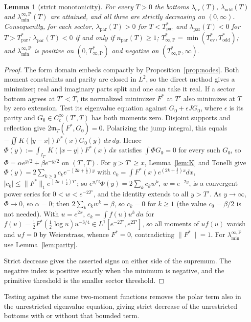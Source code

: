 \documentclass[10pt]{amsart}
\newtheorem{lemma}[theorem]{Lemma}
\theoremstyle{definition}
\theoremstyle{remark}
\newcommand{\mT}{\mathfrak m_T}
\newcommand{\laminfP}{\lambda^{\infty,\mathrm P}_{\min}}
\begin{document}
\begin{lemma}[strict monotonicity]\label{lem:strict}
For every $T>0$ the bottoms $\lambda_{\mathrm{ev}}(T)$, $\lambda_{\mathrm{odd}}(T)$ and
$\laminfP(T)$ are attained, and all three are strictly decreasing on $(0,\infty)$. Consequently, for each
sector, $\lambda_{\mathrm{par}}(T)>0$ for $T<T^*_{\mathrm{par}}$ and $\lambda_{\mathrm{par}}(T)<0$ for
$T>T^*_{\mathrm{par}}$; $\lambda_{\mathrm{par}}(T)<0$ if and only if $n_{\mathrm{par}}(T)\ge1$;
$T^*_{\infty,\mathrm P}=\min(T^*_{\mathrm{ev}},T^*_{\mathrm{odd}})$; and $\laminfP$ is positive on
$(0,T^*_{\infty,\mathrm P})$ and negative on $(T^*_{\infty,\mathrm P},\infty)$.
\end{lemma}
\begin{proof}
The form domain embeds compactly by Proposition~\ref{prop:nodes}. Both
moment constraints and parity are closed in $L^2$, so the direct method
gives a minimizer; real and imaginary parts split and one can take it real.
If a sector bottom agrees at $T'<T$, its normalized minimizer $F^*$ at
$T'$ also minimizes at $T$ by zero extension. Test its eigenvalue equation
against $G_0+\epsilon JG_0$, where $\epsilon$ is its parity and
$G_0\in C_c^\infty(T',T)$ has both moments zero. Disjoint supports and
reflection give $2\mT(F^*,G_0)=0$. Polarizing the jump integral, this
equals $-\iint K(|y-x|)F^*(x)G_0(y)\,dx\,dy$. Hence
$\Phi(y):=\int_{I_{T'}}K(|x-y|)F^*(x)\,dx$ satisfies $\int\Phi G_0=0$ for every such $G_0$, so
$\Phi=\alpha e^{y/2}+\beta e^{-y/2}$ on $(T',T)$. For $y>T'\ge x$, Lemma~\ref{lem:K} and Tonelli give
$\Phi(y)=2\sum_{k\ge0}c_ke^{-(2k+\frac12)y}$ with $c_k=\int F^*(x)e^{(2k+\frac12)x}dx$,
$|c_k|\le\|F^*\|_1e^{(2k+\frac12)T'}$; so $e^{y/2}\Phi(y)=2\sum_kc_kw^k$, $w=e^{-2y}$, is a convergent
power series for $0<w<e^{-2T'}$, and the identity extends to all $y>T'$. As $y\to\infty$, $\Phi\to0$,
so $\alpha=0$; then $2\sum_kc_kw^k\equiv\beta$, so $c_k=0$ for $k\ge1$ (the value $c_0=\beta/2$ is not
needed). With $u=e^{2x}$, $c_k=\int f(u)u^k\,du$ for
$f(u)=\frac12F^*(\frac12\log u)u^{-3/4}\in L^1[e^{-2T'},e^{2T'}]$, so all moments of $uf(u)$ vanish and
$uf=0$ by Weierstrass, whence $F^*=0$, contradicting $\|F^*\|=1$. For $\laminfP$ use Lemma~\ref{lem:parity}.

Strict decrease gives the asserted signs on either side of the supremum.
The negative index is positive exactly when the minimum is negative,
and the primitive threshold is the smaller sector threshold.
\end{proof}
Testing against the same two-moment functions removes the polar term
also in the unrestricted eigenvalue equation, giving strict decrease
of the unrestricted bottoms with or without that bounded term.
\end{document}
